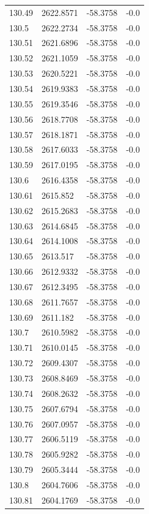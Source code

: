 \begin{table}[H]
\begin{tabular}{llll}
130.49 & 2622.8571 & -58.3758 & -0.0 \\
130.5 & 2622.2734 & -58.3758 & -0.0 \\
130.51 & 2621.6896 & -58.3758 & -0.0 \\
130.52 & 2621.1059 & -58.3758 & -0.0 \\
130.53 & 2620.5221 & -58.3758 & -0.0 \\
130.54 & 2619.9383 & -58.3758 & -0.0 \\
130.55 & 2619.3546 & -58.3758 & -0.0 \\
130.56 & 2618.7708 & -58.3758 & -0.0 \\
130.57 & 2618.1871 & -58.3758 & -0.0 \\
130.58 & 2617.6033 & -58.3758 & -0.0 \\
130.59 & 2617.0195 & -58.3758 & -0.0 \\
130.6 & 2616.4358 & -58.3758 & -0.0 \\
130.61 & 2615.852 & -58.3758 & -0.0 \\
130.62 & 2615.2683 & -58.3758 & -0.0 \\
130.63 & 2614.6845 & -58.3758 & -0.0 \\
130.64 & 2614.1008 & -58.3758 & -0.0 \\
130.65 & 2613.517 & -58.3758 & -0.0 \\
130.66 & 2612.9332 & -58.3758 & -0.0 \\
130.67 & 2612.3495 & -58.3758 & -0.0 \\
130.68 & 2611.7657 & -58.3758 & -0.0 \\
130.69 & 2611.182 & -58.3758 & -0.0 \\
130.7 & 2610.5982 & -58.3758 & -0.0 \\
130.71 & 2610.0145 & -58.3758 & -0.0 \\
130.72 & 2609.4307 & -58.3758 & -0.0 \\
130.73 & 2608.8469 & -58.3758 & -0.0 \\
130.74 & 2608.2632 & -58.3758 & -0.0 \\
130.75 & 2607.6794 & -58.3758 & -0.0 \\
130.76 & 2607.0957 & -58.3758 & -0.0 \\
130.77 & 2606.5119 & -58.3758 & -0.0 \\
130.78 & 2605.9282 & -58.3758 & -0.0 \\
130.79 & 2605.3444 & -58.3758 & -0.0 \\
130.8 & 2604.7606 & -58.3758 & -0.0 \\
130.81 & 2604.1769 & -58.3758 & -0.0 \\

\end{tabular}
\end{table}
